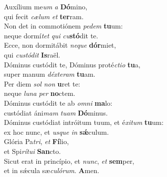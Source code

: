 \evenverse Auxílium me\textit{um} \textit{a} \textbf{Dó}mino,~\*\\
\evenverse qui fecit \textit{cæ}\textit{lum} \textit{et} \textbf{ter}ram.\\
\oddverse Non det in commotiónem \textit{pe}\textit{dem} \textbf{tu}um:~\*\\
\oddverse neque dormí\textit{tet} \textit{qui} \textit{cu}\textbf{stó}dit te.\\
\evenverse Ecce, non dormitábit \textit{ne}\textit{que} \textbf{dór}miet,~\*\\
\evenverse qui \textit{cu}\textit{stó}\textit{dit} \textbf{Is}raël.\\
\oddverse Dóminus custódit te, Dóminus proté\textit{cti}\textit{o} \textbf{tu}a,~\*\\
\oddverse super manum \textit{déx}\textit{te}\textit{ram} \textbf{tu}am.\\
\evenverse Per diem \textit{sol} \textit{non} \textbf{u}ret te:~\*\\
\evenverse neque \textit{lu}\textit{na} \textit{per} \textbf{no}ctem.\\
\oddverse Dóminus custódit te ab \textit{om}\textit{ni} \textbf{ma}lo:~\*\\
\oddverse custódiat áni\textit{mam} \textit{tu}\textit{am} \textbf{Dó}minus.\\
\evenverse Dóminus custódiat intróitum tuum, et é\textit{xi}\textit{tum} \textbf{tu}um:~\*\\
\evenverse ex hoc nunc, et \textit{us}\textit{que} \textit{in} \textbf{sǽ}culum.\\
\oddverse Glória Pa\textit{tri}, \textit{et} \textbf{Fí}lio,~\*\\
\oddverse et Spi\textit{rí}\textit{tu}\textit{i} \textbf{San}cto.\\
\evenverse Sicut erat in princípio, et \textit{nunc}, \textit{et} \textbf{sem}per,~\*\\
\evenverse et in sǽcula sæ\textit{cu}\textit{ló}\textit{rum}. \textbf{A}men.\\
